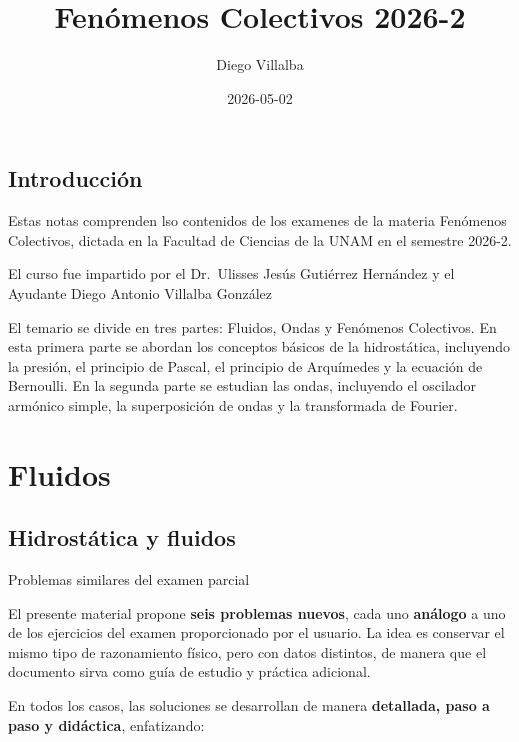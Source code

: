 \documentclass[
  letterpaper,
  DIV=11,
  numbers=noendperiod]{scrreprt}
\title{Fenómenos Colectivos 2026-2}
\author{Diego Villalba}
\date{2026-05-02}
\renewcommand*\contentsname{Table of contents}
\newcommand\contentsname{Table of contents}
\begin{document}
\maketitle

\renewcommand*\contentsname{Table of contents}
{
\hypersetup{linkcolor=}
\setcounter{tocdepth}{2}
\tableofcontents
}


\chapter*{Introducción}\label{introducciuxf3n}


Estas notas comprenden lso contenidos de los examenes de la materia
Fenómenos Colectivos, dictada en la Facultad de Ciencias de la UNAM en
el semestre 2026-2.

El curso fue impartido por el Dr.~Ulisses Jesús Gutiérrez Hernández y el
Ayudante Diego Antonio Villalba González

El temario se divide en tres partes: Fluidos, Ondas y Fenómenos
Colectivos. En esta primera parte se abordan los conceptos básicos de la
hidrostática, incluyendo la presión, el principio de Pascal, el
principio de Arquímedes y la ecuación de Bernoulli. En la segunda parte
se estudian las ondas, incluyendo el oscilador armónico simple, la
superposición de ondas y la transformada de Fourier.

\part{Fluidos}

\chapter{Hidrostática y fluidos}\label{hidrostuxe1tica-y-fluidos}

Problemas similares del examen parcial

\hfill\break

El presente material propone \textbf{seis problemas nuevos}, cada uno
\textbf{análogo} a uno de los ejercicios del examen proporcionado por el
usuario. La idea es conservar el mismo tipo de razonamiento físico, pero
con datos distintos, de manera que el documento sirva como guía de
estudio y práctica adicional.

En todos los casos, las soluciones se desarrollan de manera
\textbf{detallada, paso a paso y didáctica}, enfatizando:
\end{document}

